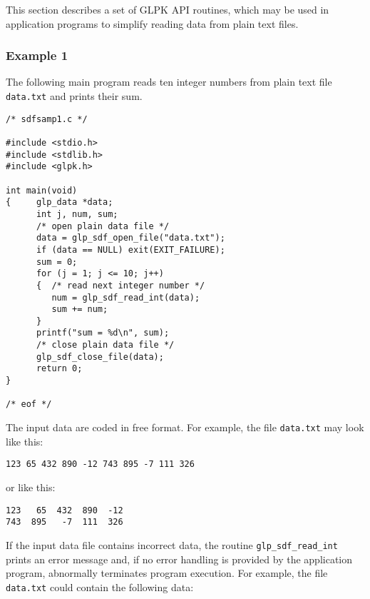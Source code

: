 This section describes a set of GLPK API routines, which may be used in
application programs to simplify reading data from plain text files.

\subsubsection*{Example 1}

The following main program reads ten integer numbers from plain text
file \verb|data.txt| and prints their sum.

\begin{footnotesize}
\begin{verbatim}
/* sdfsamp1.c */

#include <stdio.h>
#include <stdlib.h>
#include <glpk.h>

int main(void)
{     glp_data *data;
      int j, num, sum;
      /* open plain data file */
      data = glp_sdf_open_file("data.txt");
      if (data == NULL) exit(EXIT_FAILURE);
      sum = 0;
      for (j = 1; j <= 10; j++)
      {  /* read next integer number */
         num = glp_sdf_read_int(data);
         sum += num;
      }
      printf("sum = %d\n", sum);
      /* close plain data file */
      glp_sdf_close_file(data);
      return 0;
}

/* eof */
\end{verbatim}
\end{footnotesize}

The input data are coded in free format. For example, the file
\verb|data.txt| may look like this:

\begin{footnotesize}
\begin{verbatim}
123 65 432 890 -12 743 895 -7 111 326
\end{verbatim}
\end{footnotesize}

\noindent
or like this:

\begin{footnotesize}
\begin{verbatim}
123   65  432  890  -12
743  895   -7  111  326
\end{verbatim}
\end{footnotesize}

\noindent
If the input data file contains incorrect data, the routine
\verb|glp_sdf_read_int| prints an error message and, if no error
handling is provided by the application program, abnormally terminates
program execution. For example, the file \verb|data.txt| could contain
the following data:

